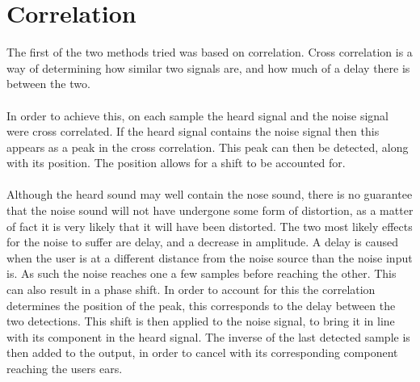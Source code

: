 \section{Correlation}

The first of the two methods tried was based on correlation.
Cross correlation is a way of determining how similar two signals are, and how much of a delay there is between the two.
\\
\\
In order to achieve this, on each sample the heard signal and the noise signal were cross correlated.
If the heard signal contains the noise signal then this appears as a peak in the cross correlation.
This peak can then be detected, along with its position.
The position allows for a shift to be accounted for.
\\
\\
Although the heard sound may well contain the nose sound, there is no guarantee that the noise sound will not have undergone some form of distortion, as a matter of fact it is very likely that it will have been distorted.
The two most likely effects for the noise to suffer are delay, and a decrease in amplitude.
A delay is caused when the user is at a different distance from the noise source than the noise input is.
As such the noise reaches one a few samples before reaching the other.
This can also result in a phase shift.
In order to account for this the correlation determines the position of the peak, this corresponds to the delay between the two detections.
This shift is then applied to the noise signal, to bring it in line with its component in the heard signal.
The inverse of the last detected sample is then added to the output, in order to cancel with its corresponding component reaching the users ears.
